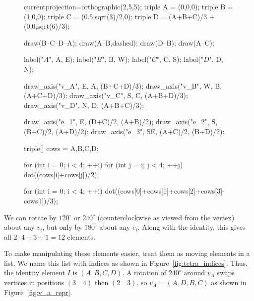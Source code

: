 \documentclass[../key.tex]{subfiles}
\begin{document}
\begin{figure}[h]
	\begin{center}
		\begin{minipage}[b]{\textwidth}
			\centering
			\begin{asy}[width=0.5\textwidth]
			currentprojection=orthographic(2,5,5);
			triple A = (0,0,0);
			triple B = (1,0,0);
			triple C = (0.5,sqrt(3)/2,0);
			triple D = (A+B+C)/3 + (0,0,sqrt(6)/3);
			
			draw(B--C--D--A);
			draw(A--B,dashed);
			draw(D--B);
			draw(A--C);
			
			label("$A$", A, E);
			label("$B$", B, W);
			label("$C$", C, S);
			label("$D$", D, N);
			
			draw_axis("v_A", E, A, (B+C+D)/3);
			draw_axis("v_B", W, B, (A+C+D)/3);
			draw_axis("v_C", S, C, (A+B+D)/3);
			draw_axis("v_D", N, D, (A+B+C)/3);
			
			draw_axis("e_1", E, (D+C)/2, (A+B)/2);
			draw_axis("e_2", S, (B+C)/2, (A+D)/2);
			draw_axis("e_3", SE, (A+C)/2, (B+D)/2);
			
			triple[] cows = {A,B,C,D};
			
			for (int i = 0; i < 4; ++i) {
				for (int j = i; j < 4; ++j) {
					dot((cows[i]+cows[j])/2);
				}
			}
			
			for (int i = 0; i < 4; ++i) {
				dot((cows[0]+cows[1]+cows[2]+cows[3]-cows[i])/3);
			}
			
			\end{asy}
		\end{minipage}
	\end{center}
	\vspace*{-2\baselineskip}
	\begin{center}
		\begin{minipage}[t]{\textwidth}
			\label{fig:tetra_rot_axes}
		\end{minipage}
	\end{center}
	\vspace*{-2\baselineskip}
\end{figure}

\noindent We can rotate by $120^\circ$ or $240^\circ$ (counterclockwise as viewed from the vertex) about any $v_i$, but only by $180^\circ$ about any $e_i$. Along with the identity, this gives all $2\cdot 4+3+1=12$ elements.

To make manipulating these elements easier, treat them as moving elements in a list. We name this list with indices as shown in Figure~\ref{fig:tetra_indices}. Thus, the identity element $I$ is $(A,B,C,D)$. A rotation of $240^\circ$ around $v_A$ swaps vertices in positions $(3\quad 4)$ then $(2\quad 3)$, so $v_A=(A,D,B,C)$ as shown in Figure~\ref{fig:v_a_repr}.
\end{document}

